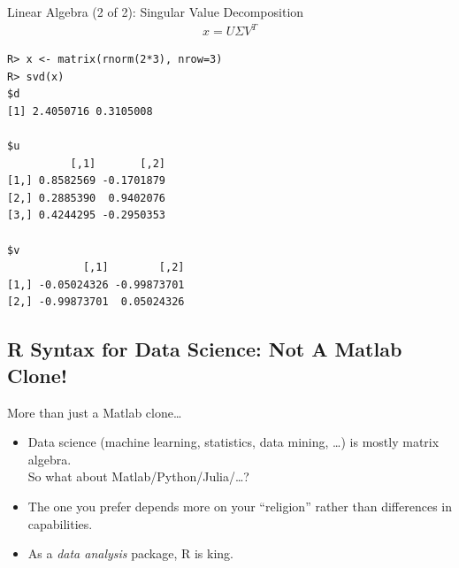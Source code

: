 \begin{frame}
  \begin{exampleblock}{Linear Algebra (2 of 2): Singular Value 
Decomposition}\pause
  \begin{align*}
    x = U\Sigma V^T
  \end{align*}
\begin{lstlisting}[backgroundcolor=\color{white},basicstyle=\ttfamily\color{
dkgray}\scriptsize,keywordstyle=\color{black}, 
  commentstyle=\color{orange},stringstyle=\color{mauve}]
R> x <- matrix(rnorm(2*3), nrow=3)
R> svd(x)
$d
[1] 2.4050716 0.3105008

$u
          [,1]       [,2]
[1,] 0.8582569 -0.1701879
[2,] 0.2885390  0.9402076
[3,] 0.4244295 -0.2950353

$v
            [,1]        [,2]
[1,] -0.05024326 -0.99873701
[2,] -0.99873701  0.05024326

\end{lstlisting}
  \end{exampleblock}
\end{frame}





\subsection{R Syntax for Data Science:  Not A Matlab Clone!}

\begin{frame}
  \begin{block}{More than just a Matlab clone\dots}\pause
  \begin{itemize}[<+-|alert@+>]
    \item Data science (machine learning, statistics, data mining, \dots) is 
mostly matrix algebra.  \\[.2cm]
     So what about Matlab/Python/Julia/\dots ?
    \item The one you prefer depends more on your ``religion'' rather than 
differences in capabilities.
    \item As a \emph{data analysis} package, R is king.
  \end{itemize}
\end{block}
\end{frame}


